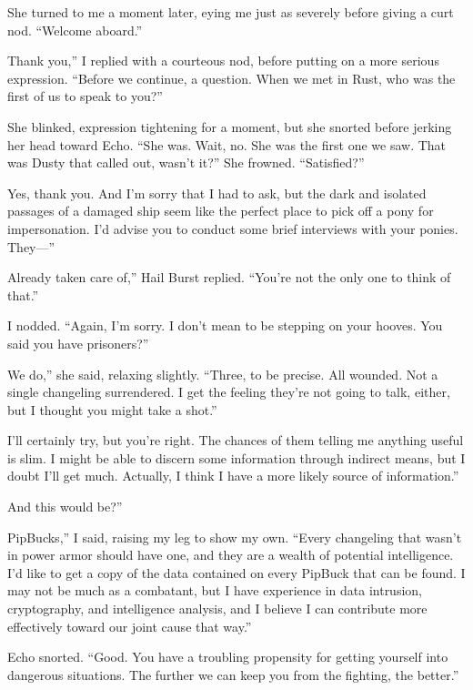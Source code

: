 She turned to me a moment later, eying me just as severely before giving a curt nod. “Welcome aboard.”

\leavevmode{}Thank you,” I replied with a courteous nod, before putting on a more serious expression. “Before we continue, a question. When we met in Rust, who was the first of us to speak to you?”

She blinked, expression tightening for a moment, but she snorted before jerking her head toward Echo. “She was. Wait, no. She was the first one we saw. That was Dusty that called out, wasn’t it?” She frowned. “Satisfied?”

\leavevmode{}Yes, thank you. And I’m sorry that I had to ask, but the dark and isolated passages of a damaged ship seem like the perfect place to pick off a pony for impersonation. I’d advise you to conduct some brief interviews with your ponies. They—”

\leavevmode{}Already taken care of,” Hail Burst replied. “You’re not the only one to think of that.”

I nodded. “Again, I’m sorry. I don’t mean to be stepping on your hooves. You said you have prisoners?”

\leavevmode{}We do,” she said, relaxing slightly. “Three, to be precise. All wounded. Not a single changeling surrendered. I get the feeling they’re not going to talk, either, but I thought you might take a shot.”

\leavevmode{}I’ll certainly try, but you’re right. The chances of them telling me anything useful is slim. I might be able to discern some information through indirect means, but I doubt I’ll get much. Actually, I think I have a more likely source of information.”

\leavevmode{}And this would be?”

\leavevmode{}PipBucks,” I said, raising my leg to show my own. “Every changeling that wasn’t in power armor should have one, and they are a wealth of potential intelligence. I’d like to get a copy of the data contained on every PipBuck that can be found. I may not be much as a combatant, but I have experience in data intrusion, cryptography, and intelligence analysis, and I believe I can contribute more effectively toward our joint cause that way.”

Echo snorted. “Good. You have a troubling propensity for getting yourself into dangerous situations. The further we can keep you from the fighting, the better.”

